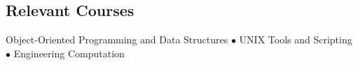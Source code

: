 
\subsection*{Relevant Courses}

Object-Oriented Programming and Data Structures $\bullet$ UNIX Tools and Scripting $\bullet$ Engineering Computation
